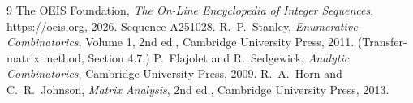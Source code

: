 \documentclass[11pt,a4paper]{article}
\theoremstyle{plain}
\theoremstyle{definition}
\begin{document}
\begin{thebibliography}{9}
 The OEIS Foundation, \emph{The On-Line Encyclopedia of Integer
Sequences}, \url{https://oeis.org}, 2026. Sequence A251028.
 R.~P.~Stanley, \emph{Enumerative Combinatorics}, Volume 1, 2nd ed.,
Cambridge University Press, 2011. (Transfer-matrix method, Section 4.7.)
 P.~Flajolet and R.~Sedgewick, \emph{Analytic Combinatorics}, Cambridge
University Press, 2009.
 R.~A.~Horn and C.~R.~Johnson, \emph{Matrix Analysis}, 2nd ed., Cambridge
University Press, 2013.
\end{thebibliography}
\end{document}
